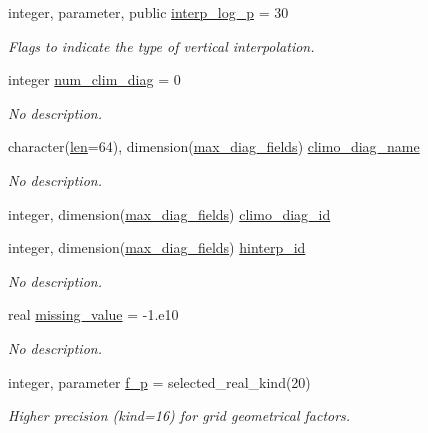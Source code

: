 \begin{DoxyCompactItemize}
\item 
integer, parameter, public \hyperlink{namespaceinterpolator__mod_a7acb040c71c8d9a10d564444ab9a204b}{interp\+\_\+log\+\_\+p} = 30
\begin{DoxyCompactList}\small\item\em Flags to indicate the type of vertical interpolation. \end{DoxyCompactList}\item 
integer \hyperlink{namespaceinterpolator__mod_ad8083acb68a1b01f066355895089068d}{num\+\_\+clim\+\_\+diag} = 0
\begin{DoxyCompactList}\small\item\em No description. \end{DoxyCompactList}\item 
character(\hyperlink{namespaceinterpolator__mod_a6bd2ec3395203e1b6aba0610bfbfe16b}{len}=64), dimension(\hyperlink{namespaceinterpolator__mod_ab8f01630409343faf00eff7cf2e78bdb}{max\+\_\+diag\+\_\+fields}) \hyperlink{namespaceinterpolator__mod_aa4a4770d40b28a65a860644479f96981}{climo\+\_\+diag\+\_\+name}
\begin{DoxyCompactList}\small\item\em No description. \end{DoxyCompactList}\item 
integer, dimension(\hyperlink{namespaceinterpolator__mod_ab8f01630409343faf00eff7cf2e78bdb}{max\+\_\+diag\+\_\+fields}) \hyperlink{namespaceinterpolator__mod_a6ca0a0304189407d598752712c9a89c5}{climo\+\_\+diag\+\_\+id}
\item 
integer, dimension(\hyperlink{namespaceinterpolator__mod_ab8f01630409343faf00eff7cf2e78bdb}{max\+\_\+diag\+\_\+fields}) \hyperlink{namespaceinterpolator__mod_a540181c07fce2c581ddf5025038c966c}{hinterp\+\_\+id}
\begin{DoxyCompactList}\small\item\em No description. \end{DoxyCompactList}\item 
real \hyperlink{namespaceinterpolator__mod_ad8078f4ec0772ef91cafcbdbeb84c16c}{missing\+\_\+value} = -\/1.e10
\begin{DoxyCompactList}\small\item\em No description. \end{DoxyCompactList}\item 
integer, parameter \hyperlink{namespaceinterpolator__mod_a6fe24c8b10c7e0d39a5d6bf1b74eeb2b}{f\+\_\+p} = selected\+\_\+real\+\_\+kind(20)
\begin{DoxyCompactList}\small\item\em Higher precision (kind=16) for grid geometrical factors. \end{DoxyCompactList}\item 

\end{DoxyCompactItemize}
